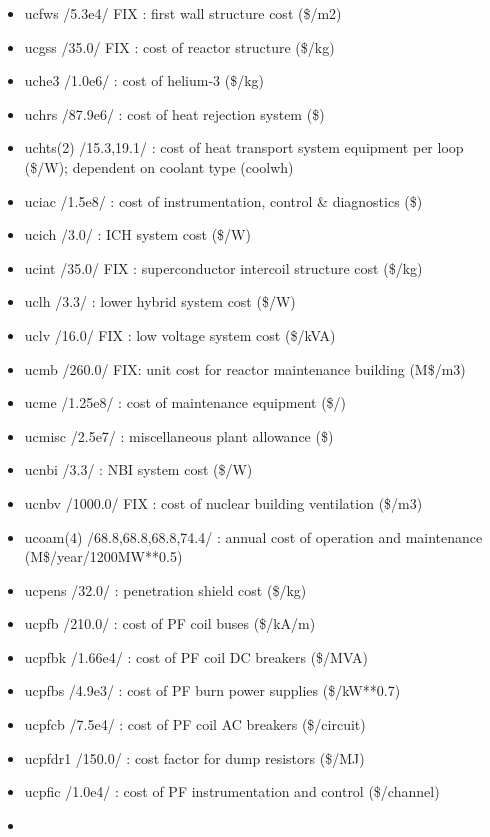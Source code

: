 \documentclass[]{article}
\begin{document}
\begin{itemize}
\begin{itemize}
  \item
    ucfws /5.3e4/ FIX : first wall structure cost (\$/m2)
  \item
    ucgss /35.0/ FIX : cost of reactor structure (\$/kg)
  \item
    uche3 /1.0e6/ : cost of helium-3 (\$/kg)
  \item
    uchrs /87.9e6/ : cost of heat rejection system (\$)
  \item
    uchts(2) /15.3,19.1/ : cost of heat transport system equipment per
    loop (\$/W); dependent on coolant type (coolwh)
  \item
    uciac /1.5e8/ : cost of instrumentation, control \& diagnostics (\$)
  \item
    ucich /3.0/ : ICH system cost (\$/W)
  \item
    ucint /35.0/ FIX : superconductor intercoil structure cost (\$/kg)
  \item
    uclh /3.3/ : lower hybrid system cost (\$/W)
  \item
    uclv /16.0/ FIX : low voltage system cost (\$/kVA)
  \item
    ucmb /260.0/ FIX: unit cost for reactor maintenance building
    (M\$/m3)
  \item
    ucme /1.25e8/ : cost of maintenance equipment (\$/)
  \item
    ucmisc /2.5e7/ : miscellaneous plant allowance (\$)
  \item
    ucnbi /3.3/ : NBI system cost (\$/W)
  \item
    ucnbv /1000.0/ FIX : cost of nuclear building ventilation (\$/m3)
  \item
    ucoam(4) /68.8,68.8,68.8,74.4/ : annual cost of operation and
    maintenance (M\$/year/1200MW**0.5)
  \item
    ucpens /32.0/ : penetration shield cost (\$/kg)
  \item
    ucpfb /210.0/ : cost of PF coil buses (\$/kA/m)
  \item
    ucpfbk /1.66e4/ : cost of PF coil DC breakers (\$/MVA)
  \item
    ucpfbs /4.9e3/ : cost of PF burn power supplies (\$/kW**0.7)
  \item
    ucpfcb /7.5e4/ : cost of PF coil AC breakers (\$/circuit)
  \item
    ucpfdr1 /150.0/ : cost factor for dump resistors (\$/MJ)
  \item
    ucpfic /1.0e4/ : cost of PF instrumentation and control (\$/channel)
  \item

\end{itemize}
\end{itemize}
\end{document}
